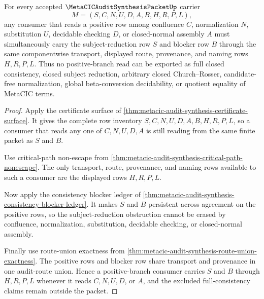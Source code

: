 \begin{theorem}
\label{thm:metacic-audit-synthesis-positive-blocker-union}
For every accepted $\MetaCICAuditSynthesisPacketUp$ carrier
$$
M=(S,C,N,U,D,A,B,H,R,P,L),
$$
any consumer that reads a positive row among confluence $C$, normalization $N$, substitution $U$, decidable checking $D$, or closed-normal assembly $A$ must simultaneously carry the subject-reduction row $S$ and blocker row $B$ through the same componentwise transport, displayed route, provenance, and naming rows $H,R,P,L$. Thus no positive-branch read can be exported as full closed consistency, closed subject reduction, arbitrary closed Church--Rosser, candidate-free normalization, global beta-conversion decidability, or quotient equality of MetaCIC terms.
\end{theorem}
\begin{proof}
Apply the certificate surface of \autoref{thm:metacic-audit-synthesis-certificate-surface}. It gives the complete row inventory $S,C,N,U,D,A,B,H,R,P,L$, so a consumer that reads any one of $C,N,U,D,A$ is still reading from the same finite packet as $S$ and $B$.

Use critical-path non-escape from \autoref{thm:metacic-audit-synthesis-critical-path-nonescape}. The only transport, route, provenance, and naming rows available to such a consumer are the displayed rows $H,R,P,L$.

Now apply the consistency blocker ledger of \autoref{thm:metacic-audit-synthesis-consistency-blocker-ledger}. It makes $S$ and $B$ persistent across agreement on the positive rows, so the subject-reduction obstruction cannot be erased by confluence, normalization, substitution, decidable checking, or closed-normal assembly.

Finally use route-union exactness from \autoref{thm:metacic-audit-synthesis-route-union-exactness}. The positive rows and blocker row share transport and provenance in one audit-route union. Hence a positive-branch consumer carries $S$ and $B$ through $H,R,P,L$ whenever it reads $C,N,U,D$, or $A$, and the excluded full-consistency claims remain outside the packet.
\end{proof}


